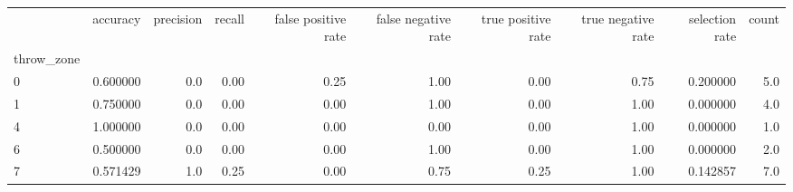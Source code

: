 \begin{tabular}{lrrrrrrrrr}
\toprule
{} &  accuracy &  precision &  recall &  false positive rate &  false negative rate &  true positive rate &  true negative rate &  selection rate &  count \\
throw\_zone &           &            &         &                      &                      &                     &                     &                 &        \\
\midrule
0          &  0.600000 &        0.0 &    0.00 &                 0.25 &                 1.00 &                0.00 &                0.75 &        0.200000 &    5.0 \\
1          &  0.750000 &        0.0 &    0.00 &                 0.00 &                 1.00 &                0.00 &                1.00 &        0.000000 &    4.0 \\
4          &  1.000000 &        0.0 &    0.00 &                 0.00 &                 0.00 &                0.00 &                1.00 &        0.000000 &    1.0 \\
6          &  0.500000 &        0.0 &    0.00 &                 0.00 &                 1.00 &                0.00 &                1.00 &        0.000000 &    2.0 \\
7          &  0.571429 &        1.0 &    0.25 &                 0.00 &                 0.75 &                0.25 &                1.00 &        0.142857 &    7.0 \\
\bottomrule
\end{tabular}
